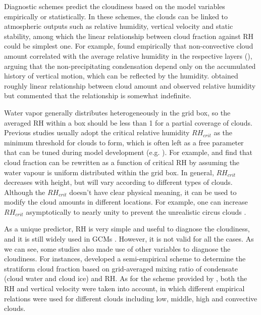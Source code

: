 Diagnostic schemes predict the cloudiness based on the model variables empirically or statistically. In these schemes, the clouds can be linked to atmospheric outputs such as relative humidity, vertical velocity and static stability, among which the linear relationship between cloud fraction against RH could be simplest one. For example, \cite{Smagorinsky1960} found empirically that non-convective cloud amount correlated with the average relative humidity in the respective layers (), arguing that the non-precipitating condensation depend only on the accumulated history of vertical motion, which can be reflected by the humidity. \cite{Ricketts1973} obtained roughly linear relationship between cloud amount and observed relative humidity but commented that the relationship is somewhat indefinite.

Water vapor generally distributes heterogeneously in the grid box, so the averaged RH within a box should be less than 1 for a partial coverage of clouds. Previous studies usually adopt the critical relative humidity $RH_{crit}$ as the minimum threshold for clouds to form, which is often left as a free parameter that can be tuned during model development (e.g. \citealp{Hourdin2017,Kay2012,Mauritsen2012}). For example, \cite{Sundqvist1978} and \cite{Sundqvist1989} find that cloud fraction can be rewritten as a function of critical RH by assuming the water vapour is uniform distributed within the grid box. In general, $RH_{crit}$ decreases with height, but will vary according to different types of clouds. Although the $RH_{crit}$ doesn't have clear physical meaning, it can be used to modify the cloud amounts in different locations. For example, one can increase $RH_{crit}$ asymptotically to nearly unity to prevent the unrealistic circus clouds \citep{Sundqvist1989}. 

As a unique predictor, RH is very simple and useful to diagnose the cloudiness, and it is still widely used in GCMs \citep[e.g.,][]{Gordon1992,Park2014,Pope2000}. However, it is not valid for all the cases. As we can see, some studies also made use of other variables to diagnose the cloudiness. For instances, \cite{Xu1996} developed a semi-empirical scheme to determine the stratiform cloud fraction based on grid-averaged mixing ratio of condensate (cloud water and cloud ice) and RH. As for the scheme provided by \cite{Slingo1987}, both the RH and vertical velocity were taken into account, in which different empirical relations were used for different clouds including low, middle, high and convective clouds.

